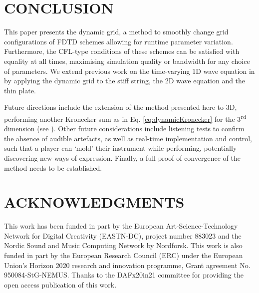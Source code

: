 \documentclass[fleqn]{jaes}
\begin{document}
\section{CONCLUSION}\label{sec:conclusion}
This paper presents the dynamic grid, a method to smoothly change grid configurations of FDTD schemes allowing for runtime parameter variation. Furthermore, the CFL-type conditions of these schemes can be satisfied with equality at all times, maximising simulation quality or bandwidth for any choice of parameters. We extend previous work on the time-varying 1D wave equation in \cite{Willemsen2021a} by applying the dynamic grid to the stiff string, the 2D wave equation and the thin plate. 
%

Future directions include the extension of the method presented here to 3D, performing another Kronecker sum as in Eq. \eqref{eq:dynamicKronecker} for the 3\textsuperscript{rd} dimension (see \cite{Hamilton2016}). Other future considerations include listening tests to confirm the absence of audible artefacts, as well as real-time implementation and control, such that a player can `mold' their instrument while performing, potentially discovering new ways of expression. Finally, a full proof of convergence of the method needs to be established. 
\vspace{-0.3em}
\section{ACKNOWLEDGMENTS}
\vspace{-0.2em}
This  work  has  been  funded  in  part  by  the European Art-Science-Technology Network for Digital Creativity (EASTN-DC), project number 883023 and the Nordic Sound and Music Computing Network by Nordforsk. This work is also funded in part by the European Research Council (ERC) under the European Union’s Horizon 2020 research and innovation programme, Grant agreement No. 950084-StG-NEMUS. Thanks to the DAFx20in21 committee for providing the open access publication of this work.
\vspace{-0.9em}
\end{document}
